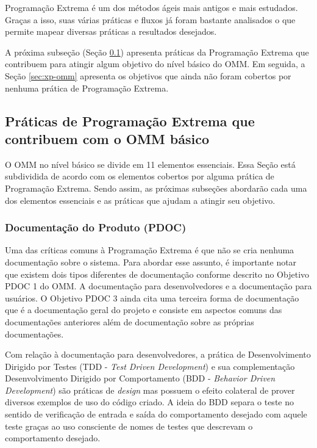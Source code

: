 Programação Extrema é um dos métodos ágeis mais antigos e mais
estudados. Graças a isso, suas várias práticas e fluxos já foram
bastante analisados o que permite mapear diversas práticas a
resultados desejados.

A próxima subseção (Seção \ref{sec:xp+omm}) apresenta
práticas da Programação Extrema que contribuem para atingir algum
objetivo do nível básico do OMM. Em seguida, a Seção \ref{sec:xp-omm}
apresenta os objetivos que ainda não foram cobertos por nenhuma
prática de Programação Extrema.

\subsection{Práticas de Programação Extrema que contribuem com o OMM
  básico}
\label{sec:xp+omm}

O OMM no nível básico se divide em 11 elementos essenciais. Essa Seção
está subdividida de acordo com os elementos cobertos por alguma prática
de Programação Extrema. Sendo assim, as próximas subseções abordarão
cada uma dos elementos essenciais e as práticas que ajudam a atingir
seu objetivo.

\subsubsection{Documentação do Produto (PDOC)}
\label{sec:+pdoc}

Uma das críticas comuns à Programação Extrema é que não se cria
nenhuma documentação sobre o sistema. Para abordar esse assunto, é
importante notar que existem dois tipos diferentes de documentação
conforme descrito no Objetivo PDOC 1 do OMM. A documentação para
desenvolvedores e a documentação para usuários. O Objetivo PDOC 3
ainda cita uma terceira forma de documentação que é a documentação
geral do projeto e consiste em aspectos comuns das documentações
anteriores além de documentação sobre as próprias documentações.

Com relação à documentação para desenvolvedores, a prática de
Desenvolvimento Dirigido por Testes (TDD - \textit{Test Driven
  Development}) e sua complementação Desenvolvimento Dirigido por
Comportamento (BDD - \textit{Behavior Driven Development}) são práticas
de \textit{design} mas possuem o efeito colateral de prover diversos
exemplos de uso do código criado. A ideia do BDD separa o teste no
sentido de verificação de entrada e saída do comportamento desejado
com aquele teste graças ao uso consciente de nomes de testes que
descrevam o comportamento desejado.

